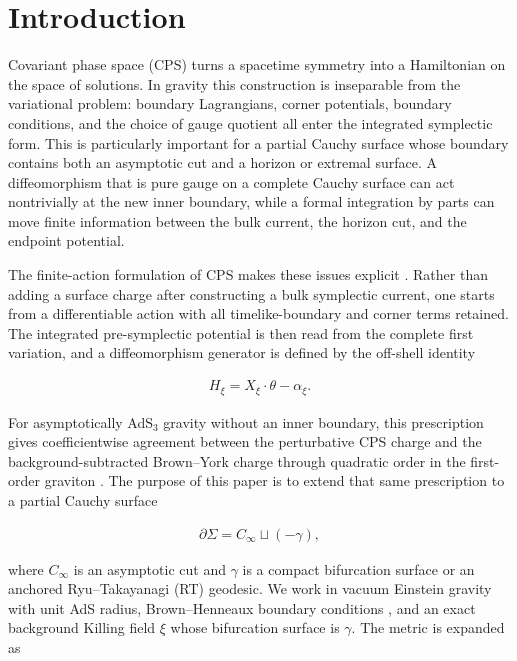 \section{Introduction}\label{sec:introduction}

Covariant phase space (CPS) turns a spacetime symmetry into a Hamiltonian on the space of solutions. In gravity this construction is inseparable from the variational problem: boundary Lagrangians, corner potentials, boundary conditions, and the choice of gauge quotient all enter the integrated symplectic form. This is particularly important for a partial Cauchy surface whose boundary contains both an asymptotic cut and a horizon or extremal surface. A diffeomorphism that is pure gauge on a complete Cauchy surface can act nontrivially at the new inner boundary, while a formal integration by parts can move finite information between the bulk current, the horizon cut, and the endpoint potential.

The finite-action formulation of CPS makes these issues explicit \cite{Harlow:2019yfa}. Rather than adding a surface charge after constructing a bulk symplectic current, one starts from a differentiable action with all timelike-boundary and corner terms retained. The integrated pre-symplectic potential is then read from the complete first variation, and a diffeomorphism generator is defined by the off-shell identity

\begin{align}
H_\xi=X_\xi\mathbin{\cdot}\theta-\alpha_\xi .
\end{align}

For asymptotically AdS$_3$ gravity without an inner boundary, this prescription gives coefficientwise agreement between the perturbative CPS charge and the background-subtracted Brown--York charge through quadratic order in the first-order graviton \cite{Chen:2026bulkboundary,Gao:2026graviton}. The purpose of this paper is to extend that same prescription to a partial Cauchy surface

\begin{align}
\partial\Sigma=C_\infty\sqcup(-\gamma),
\end{align}

where $C_\infty$ is an asymptotic cut and $\gamma$ is a compact bifurcation surface or an anchored Ryu--Takayanagi (RT) geodesic. We work in vacuum Einstein gravity with unit AdS radius, Brown--Henneaux boundary conditions \cite{Brown:1986nw}, and an exact background Killing field $\xi$ whose bifurcation surface is $\gamma$. The metric is expanded as

